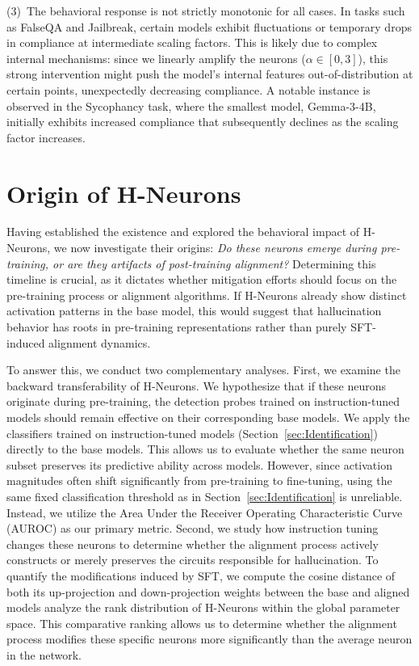 \documentclass[dvipsnames]{article}
\begin{document}
(3)~The behavioral response is not strictly monotonic for all cases. In tasks such as FalseQA and Jailbreak, certain models exhibit fluctuations or temporary drops in compliance at intermediate scaling factors. This is likely due to complex internal mechanisms: since we linearly amplify the neurons ($\alpha \in [0, 3]$), this strong intervention might push the model's internal features out-of-distribution at certain points, unexpectedly decreasing compliance. A notable instance is observed in the Sycophancy task, where the smallest model, Gemma-3-4B, initially exhibits increased compliance that subsequently declines as the scaling factor increases. %


\section{Origin of H-Neurons}
% 
Having established the existence and explored the behavioral impact of H-Neurons, we now investigate their origins: \textit{Do these neurons emerge during pre-training, or are they artifacts of post-training alignment?} Determining this timeline is crucial, as it dictates whether mitigation efforts should focus on the pre-training process or alignment algorithms. 
If H-Neurons already show distinct activation patterns in the base model, this would suggest that hallucination behavior has roots in pre-training representations rather than purely SFT-induced alignment dynamics.

To answer this, we conduct two complementary analyses. First, we examine the backward transferability of H-Neurons. We hypothesize that if these neurons originate during pre-training, the detection probes trained on instruction-tuned models should remain effective on their corresponding base models. We apply the classifiers trained on instruction-tuned models (Section~\ref{sec:Identification}) directly to the base models. This allows us to evaluate whether the same neuron subset preserves its predictive ability across models. However, since activation magnitudes often shift significantly from pre-training to fine-tuning, using the same fixed classification threshold as in Section~\ref{sec:Identification} is unreliable. Instead, we utilize the Area Under the Receiver Operating Characteristic Curve (AUROC) as our primary metric. 
Second, we study how instruction tuning changes these neurons to determine whether the alignment process actively constructs or merely preserves the circuits responsible for hallucination. To quantify the modifications induced by SFT, we compute the cosine distance of both its up-projection and down-projection weights between the base and aligned models analyze the rank distribution of H-Neurons within the global parameter space. This comparative ranking allows us to determine whether the alignment process modifies these specific neurons more significantly than the average neuron in the network.
\end{document}
